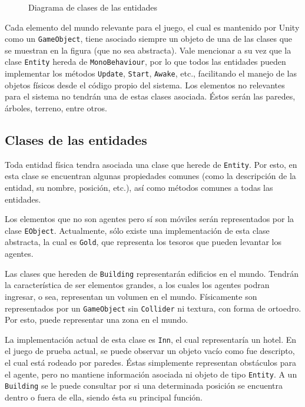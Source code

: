 \documentclass[a4paper,oneside]{article}
\begin{document}
\begin{figure}
 \centering

 \caption{Diagrama de clases de las entidades}
 \label{fig:diagramaDeClasesEntidades}
\end{figure}

Cada elemento del mundo relevante para el juego, el cual es mantenido por Unity
como un \texttt{GameObject}, tiene asociado siempre un objeto de una de las
clases que se muestran en la figura (que no sea abstracta). 
Vale mencionar a su vez que la clase \texttt{Entity} hereda de
\texttt{MonoBehaviour}, por lo que todos las entidades pueden implementar los
métodos \texttt{Update}, \texttt{Start}, \texttt{Awake}, etc., facilitando el
manejo de las objetos físicos desde el código propio del sistema. 
Los elementos no relevantes para el sistema no tendrán una de estas clases
asociada. 
Éstos serán las paredes, árboles, terreno, entre otros.

\subsection{Clases de las entidades}

Toda entidad física tendra asociada una clase que herede de \texttt{Entity}. 
Por esto, en esta clase se encuentran algunas propiedades comunes (como la
descripción de la entidad, su nombre, posición, etc.), así como métodos comunes
a todas las entidades.

Los elementos que no son agentes pero sí son móviles serán representados por la
clase \texttt{EObject}. 
Actualmente, sólo existe una implementación de esta clase abstracta, la cual es
\texttt{Gold}, que representa los tesoros que pueden levantar los agentes.

Las clases que hereden de \texttt{Building} representarán edificios en el mundo.
Tendrán la característica de ser elementos grandes, a los cuales los agentes
podran ingresar, o sea, representan un volumen en el mundo. 
Físicamente son representados por un \texttt{GameObject} sin \texttt{Collider}
ni textura, con forma de ortoedro. 
Por esto, puede representar una zona en el mundo.

La implementación actual de esta clase es \texttt{Inn}, el cual representaría un
hotel. En el juego de prueba actual, se puede observar un objeto vacío como fue
descripto, el cual está rodeado por paredes. Éstas simplemente representan
obstáculos para el agente, pero no mantiene información asociada ni objeto de
tipo \texttt{Entity}.  A un \texttt{Building} se le puede consultar por si una
determinada posición se encuentra dentro o fuera de ella, siendo ésta su
principal función.
\end{document}
